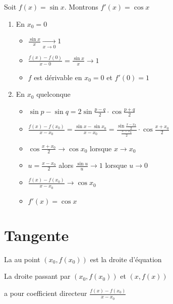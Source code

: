 \begin{frame}
\begin{exemple}
Soit $f(x)=\sin x$. Montrons $f'(x)=\cos x$

\pause

\begin{enumerate}  

  \item En $x_0=0$
\pause
  \begin{itemize} \setlength{\itemsep}{5pt} 
    \item $\frac{\sin x}{x} \xrightarrow[x\to 0]{} 1$
\pause
    \item $\frac{f(x)-f(0)}{x-0} = \frac{\sin x}{x} \to 1$
\pause
    \item $f$ est dérivable en $x_0=0$ et $f'(0)=1$
  \end{itemize}

\pause
  \item En $x_0$ quelconque
\pause
  \begin{itemize} \setlength{\itemsep}{5pt}
    \item $\sin p-\sin q = 2\sin \frac{p-q}{2}\cdot\cos\frac{p+q}{2}$
\pause
    \item $\frac{f(x)-f(x_0)}{x-x_0} = \frac{\sin x - \sin x_0}{x-x_0} 
= \frac{\sin \frac{x-x_0}{2}}{\frac{x-x_0}{2}} \cdot \cos \frac{x+x_0}{2}$
\pause
    \item $\cos \frac{x+x_0}{2}\to \cos x_0$ lorsque $x\to x_0$
\pause
    \item $u=\frac{x-x_0}{2}$ alors  $\frac {\sin u}u \to 1$ lorsque $u\to 0$
\pause
    \item $\frac{f(x)-f(x_0)}{x-x_0} \to \cos x_0$
\pause
    \item $f'(x)=\cos x$
  \end{itemize}
\end{enumerate}
\end{exemple}
\end{frame}




\section*{Tangente}


\begin{frame}


La  au point $(x_0,f(x_0))$ est la droite d'équation 

\pause

La droite passant par $(x_0,f(x_0))$ et $(x,f(x))$

a pour coefficient directeur $\frac{f(x)-f(x_0)}{x-x_0}$

\pause


\end{frame}


